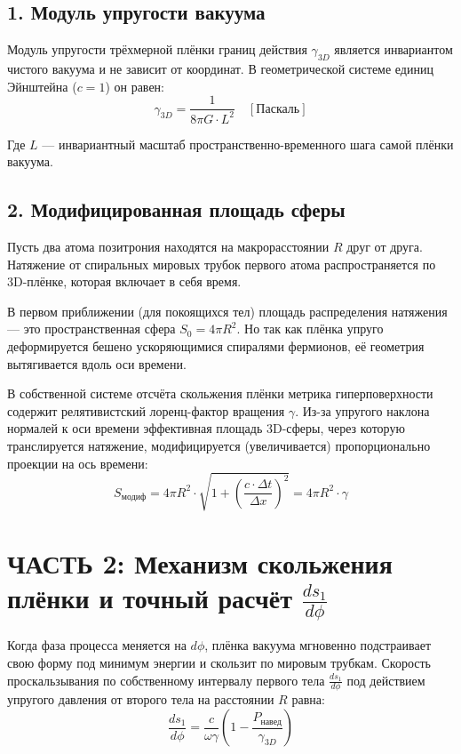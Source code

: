 \documentclass[12pt,a4paper]{article}
\begin{document}
\subsection*{1. Модуль упругости вакуума}

Модуль упругости трёхмерной плёнки границ действия $\gamma_{3D}$ является инвариантом чистого вакуума и не зависит от координат. В геометрической системе единиц Эйнштейна ($c=1$) он равен:
\begin{equation}
\gamma_{3D} = \frac{1}{8\pi G \cdot L^2} \quad [\text{Паскаль}]
\end{equation}

Где $L$ — инвариантный масштаб пространственно-временного шага самой плёнки вакуума.

\subsection*{2. Модифицированная площадь сферы}

Пусть два атома позитрония находятся на макрорасстоянии $R$ друг от друга. Натяжение от спиральных мировых трубок первого атома распространяется по 3D-плёнке, которая включает в себя время.

В первом приближении (для покоящихся тел) площадь распределения натяжения — это пространственная сфера $S_0 = 4\pi R^2$. Но так как плёнка упруго деформируется бешено ускоряющимися спиралями фермионов, её геометрия вытягивается вдоль оси времени.

В собственной системе отсчёта скольжения плёнки метрика гиперповерхности содержит релятивистский лоренц-фактор вращения $\gamma$. Из-за упругого наклона нормалей к оси времени эффективная площадь 3D-сферы, через которую транслируется натяжение, модифицируется (увеличивается) пропорционально проекции на ось времени:
\begin{equation}
S_{модиф} = 4\pi R^2 \cdot \sqrt{1 + \left(\frac{c \cdot \Delta t}{\Delta x}\right)^2} = 4\pi R^2 \cdot \gamma
\end{equation}

\section*{ЧАСТЬ 2: Механизм скольжения плёнки и точный расчёт $\frac{ds_1}{d\phi}$}

Когда фаза процесса меняется на $d\phi$, плёнка вакуума мгновенно подстраивает свою форму под минимум энергии и скользит по мировым трубкам. Скорость проскальзывания по собственному интервалу первого тела $\frac{ds_1}{d\phi}$ под действием упругого давления от второго тела на расстоянии $R$ равна:
\begin{equation}
\frac{ds_1}{d\phi} = \frac{c}{\omega \gamma} \left( 1 - \frac{P_{навед}}{\gamma_{3D}} \right)
\end{equation}
\end{document}
